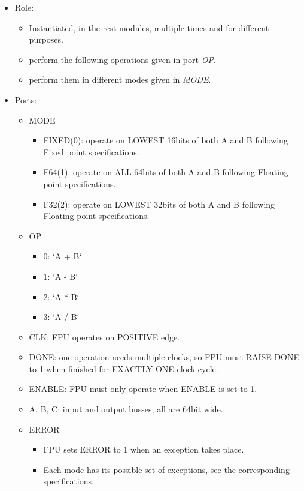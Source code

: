 \documentclass[12pt]{report}
\begin{document}
\begin{itemize}
    \item Role:
    \begin{itemize}
        \item Instantiated, in the rest modules, multiple times and for different purposes.
        \item perform the following operations given in port \emph{OP}.
        \item perform them in different modes given in \emph{MODE}.
    \end{itemize}
    \item Ports:
    \begin{itemize}
        \item MODE
        \begin{itemize}
            \item FIXED(0): operate on LOWEST 16bits of both A and B following Fixed point specifications.
            \item F64(1): operate on ALL 64bits of both A and B following Floating point specifications.
            \item F32(2): operate on LOWEST 32bits of both A and B following Floating point specifications.
        \end{itemize}
        \item OP
        \begin{itemize}
            \item 0: `A + B` 
            \item 1: `A - B` 
            \item 2: `A * B` 
            \item 3: `A / B`  
        \end{itemize}
        \item CLK: FPU operates on POSITIVE edge.
        \item DONE: one operation needs multiple clocks, so FPU must RAISE DONE to 1 when finished for EXACTLY ONE clock cycle.
        \item ENABLE: FPU must only operate when ENABLE is set to 1.
        \item A, B, C: input and output busses, all are 64bit wide.
        \item ERROR
        \begin{itemize}
            \item FPU sets ERROR to 1 when an exception takes place. 
            \item Each mode has its possible set of exceptions, see the corresponding specifications. 

\end{itemize}
\end{itemize}
\end{itemize}
\end{document}
